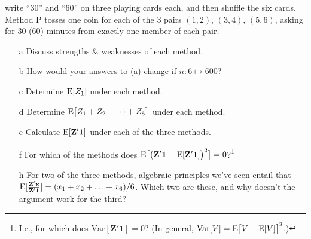\documentclass{article}
\begin{document}
\begin{enumerate}
write ``30'' and ``60'' on three playing cards each, and then shuffle
the six cards. Method P tosses one coin for each of the 3 pairs
$(1,2)$, $(3,4)$, $(5,6)$, asking for 30 (60) minutes from exactly one
member of each pair. 
  \begin{minipage}{.45\linewidth}
\begin{itemize}
\item[a] Discuss strengths \& weaknesses of each method.
\item[b] How would your answers to (a) change if $n: 6 \mapsto 600$?
\item[c] Determine $\mathrm{E}[  Z_{1} ]$  under each method.
\item[d] Determine $\mathrm{E}\big[  Z_{1} + Z_{2} + \cdots + Z_{6} \big]$ under each method.
\item[e] Calculate $\mathrm{E}[\mathbf{Z}'\mathbf{1}]$ under each of the three methods.
\end{itemize}
\end{minipage}
% 
\begin{minipage}{.45\linewidth}
  \begin{itemize}
 \item[f] For which of the methods does $\mathrm{E}
  \big[\big(\mathbf{Z}'\mathbf{1} -\mathrm{E} [\mathbf{Z}'\mathbf{1}]\big)^{2}\big] =
  0$?\footnote{I.e., for which does
    $\mathrm{Var}[\mathbf{Z}'\mathbf{1}] = 0$?  (In general,
    $\mathrm{Var}[V] = \mathrm{E} \big[V - \mathrm{E}[V] \big]^{2} $.)}
\item[h] For two of the three methods, algebraic principles we've seen
  entail that
  $\mathrm{E} [\frac{\mathbf{Z}'\mathbf{x}}{\mathbf{Z}'\mathbf{1}}] = (x_{1}
  + x_{2}+ \ldots + x_{6})/6$.  Which two are
  these, and why doesn't the argument work for the third?
\end{itemize}
\end{minipage}
\end{enumerate}
\end{document}
